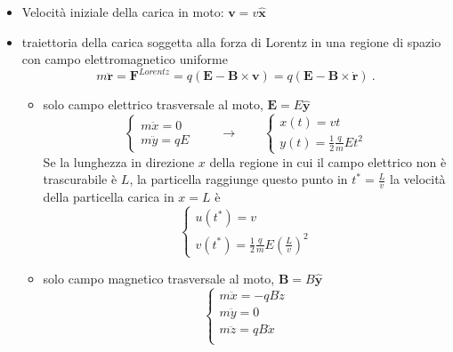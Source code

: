 \noindent
\begin{itemize}
    \item Velocità iniziale della carica in moto: $\mathbf{v} = v \mathbf{\hat{x}}$
    \item traiettoria della carica soggetta alla forza di Lorentz in una regione di spazio con campo elettromagnetico uniforme
        \begin{equation}
            m \ddot{\mathbf{r}} = \mathbf{F}^{Lorentz} = q \left ( \mathbf{E} - \mathbf{B} \times \mathbf{v} \right) =  q \left ( \mathbf{E} - \mathbf{B} \times \dot{\mathbf{r}} \right) \ .
        \end{equation}
    \begin{itemize}
        \item solo campo elettrico trasversale al moto, $\mathbf{E} = E \mathbf{\hat{y}}$
            \begin{equation}
            \begin{cases}
                m \ddot x = 0 \\
                m \ddot y = q E
            \end{cases} \qquad \rightarrow \qquad
            \begin{cases}
                x(t) = v t \\
                y(t) = \frac{1}{2} \frac{q}{m} E t^2
            \end{cases}
            \end{equation}
            Se la lunghezza in direzione $x$ della regione in cui il campo elettrico non è trascurabile è $L$, la particella raggiunge questo punto in $t^* = \frac{L}{v}$ la velocità della particella carica in $x = L$ è 
            \begin{equation}
            \begin{cases}
                u(t^*) = v \\
                v(t^*) = \frac{1}{2} \frac{q}{m} E \left( \frac{L}{v} \right)^2
            \end{cases}
            \end{equation}
        \item solo campo magnetico trasversale al moto, $\mathbf{B} = B \mathbf{\hat{y}}$ 
            \begin{equation}
            \begin{cases}
                m \ddot x = - q B \dot{z} \\
                m \ddot y = 0 \\
                m \ddot z = q B \dot{x} \\

\end{cases}
\end{equation}
\end{itemize}
\end{itemize}
